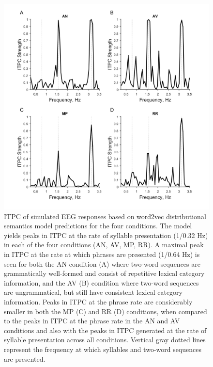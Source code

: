 \documentclass[10pt,letterpaper]{article}
\begin{document}
 \begin{figure}[tbhp]
\includegraphics[width=\linewidth]{FrankFigure_exp2_phrases_12_03_2020.png}
\caption{ITPC of simulated EEG responses based on word2vec distributional semantics model predictions for the four conditions. The model yields peaks in ITPC at the rate of syllable presentation (1/0.32 Hz) in each of the four conditions (AN, AV, MP, RR). A maximal peak in ITPC at the rate at which phrases are presented (1/0.64 Hz) is seen for both the AN condition (A) where two-word sequences are grammatically well-formed and consist of repetitive lexical category information, and the AV (B) condition where two-word sequences are ungrammatical, but still have consistent lexical category information. Peaks in ITPC at the phrase rate are considerably smaller in both the MP (C) and RR (D) conditions, when compared to the peaks in ITPC at the phrase rate in the AN and AV conditions and also with the peaks in ITPC generated at the rate of syllable presentation across all conditions. Vertical gray dotted lines represent the frequency at which syllables and two-word sequences are presented.}
\label{fig:Fig1}
\end{figure}
\end{document}
